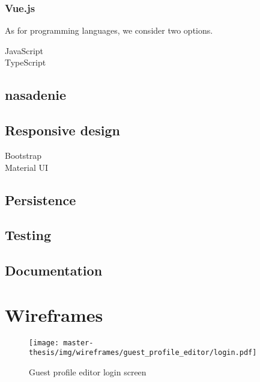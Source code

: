 \subsubsection*{Vue.js}

As for programming languages, we consider two options. 

\begin{description}
  \item[JavaScript] 
  \item[TypeScript] 
\end{description}


\subsection{nasadenie}

\subsection{Responsive design}
\begin{description}
  \item[Bootstrap] 
  \item[Material UI] 
\end{description}

\subsection{Persistence}

\subsection{Testing}

\subsection{Documentation}

\section{Wireframes}
\begin{figure}[h]
  \centering
  \texttt{[image: master-thesis/img/wireframes/guest\_profile\_editor/login.pdf]}
  \caption{Guest profile editor login screen}
\end{figure}

